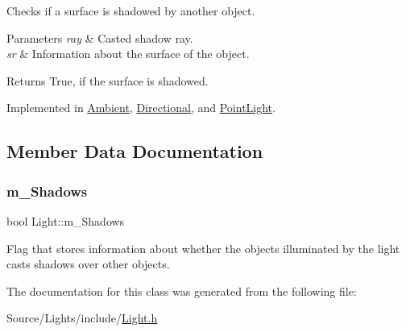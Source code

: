 Checks if a surface is shadowed by another object. 
\begin{DoxyParams}{Parameters}
{\em ray} & Casted shadow ray. \\
\hline
{\em sr} & Information about the surface of the object. \\
\hline
\end{DoxyParams}
\begin{DoxyReturn}{Returns}
True, if the surface is shadowed. 
\end{DoxyReturn}


Implemented in \hyperlink{class_ambient_a1373251f8db560b10061eb23f125bb27}{Ambient}, \hyperlink{class_directional_a56a42abcdb41df1e3dd44b173aee494a}{Directional}, and \hyperlink{class_point_light_aa4a50b149cdc22acbf2140a7e2ff9551}{Point\+Light}.



\subsection{Member Data Documentation}
\hypertarget{class_light_a84dea3da6749bb4ee4b141744344b403}{}\label{class_light_a84dea3da6749bb4ee4b141744344b403} 
\subsubsection{\texorpdfstring{m\+\_\+\+Shadows}{m\_Shadows}}
{\footnotesize\ttfamily bool Light\+::m\+\_\+\+Shadows\hspace{0.3cm}{\ttfamily [protected]}}

Flag that stores information about whether the objects illuminated by the light casts shadows over other objects. 

The documentation for this class was generated from the following file\+:\begin{DoxyCompactItemize}
\item 
Source/\+Lights/include/\hyperlink{_light_8h}{Light.\+h}\end{DoxyCompactItemize}
